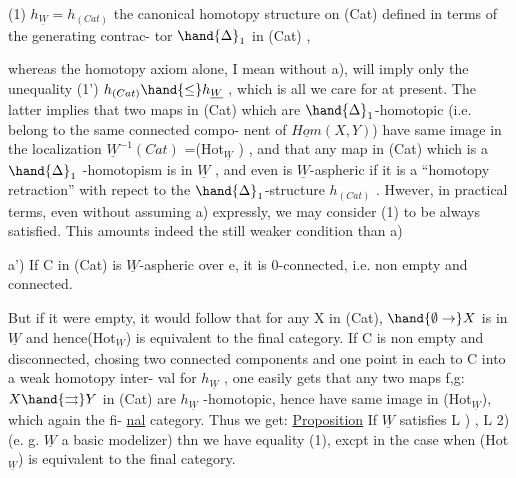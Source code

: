 
(1) \qquad $h_{\underline{W}} = h_{(Cat)}$ \quad the canonical homotopy structure on (Cat)
defined in terms of the generating contrac-%
tor $\hand{\Delta}_1$ in (Cat)\hand{,} \hfill ,

whereas the homotopy axiom  alone, I mean without a), will imply
only the unequality
(1') \qquad $h_{(Cat)} \hand{\leq} h_{\underline{W}}$ ,
which is all we care for at present. The latter implies that two maps in
(Cat) which are $\hand{\Delta}_1$-homotopic (i.e. belong to the same connected compo-%
nent of $\underline{Hom}(X,Y)$) have same image in the localization $\underline{W}^{-1}(Cat)$ =(Hot$_{\underline{W}}$ ) ,
and that any map in (Cat) which is a $\hand{\Delta}_1$ -homotopism is in $\underline{W}$ , and even
is $\underline{W}$-aspheric if it is a ``homotopy retraction'' with repect to the
$\hand{\Delta}_1$-structure $h_{(Cat)}$ . Hwever,  in practical terms, even without
assuming a) expressly, we may consider (1) to be always satisfied. This
amounts indeed  the still weaker condition than a)

 a') If C in (Cat) is $\underline{W}$-aspheric over e, it is 0-connected, i.e.
non empty and connected.

But if it were empty, it would follow that for any X in (Cat),
$\hand{\emptyset \to} X$ is in $\underline{W}$ and hence(Hot$_{\underline{W}}$) is equivalent to the final category. If
C  is non empty and disconnected, chosing  two connected
components and one point in each to  C into a weak homotopy inter-%
val for $h_{\underline{W}}$ , one easily gets that any two maps f,g: $X \hand{\rightrightarrows} Y$ in (Cat) are
$h_{\underline{W}}$ -homotopic, hence have same image in (Hot$_{\underline{W}}$), which again   the fi-%
\uline{nal} category. Thus we get:
\uline{Proposition} If $\underline{W}$ satisfies L  ) , L 2) (e. g. $\underline{W}$ a basic modelizer)
thn we have equality (1), excpt in the case when (Hot$_{\underline{W}}$) is equivalent
to the final category.

